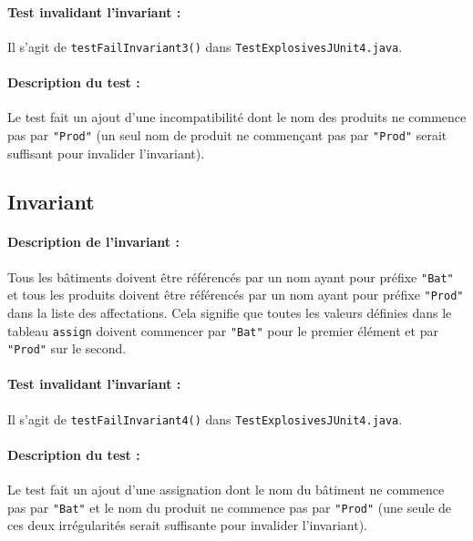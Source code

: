 \documentclass{article}
\begin{document}
\vspace{-0.2cm}
\paragraph{Test invalidant l'invariant :} Il s'agit de \texttt{testFailInvariant3()} dans \texttt{TestExplosivesJUnit4.java}.

\vspace{-0.2cm}
\paragraph{Description du test :} Le test fait un ajout d'une incompatibilité dont le nom des produits ne commence pas par \texttt{"Prod"} (un seul nom de produit ne commençant pas par \texttt{"Prod"} serait suffisant pour invalider l'invariant).

\subsection{Invariant }

\paragraph{Description de l'invariant :} Tous les bâtiments doivent être référencés par un nom ayant pour préfixe \texttt{"Bat"} et tous les produits doivent être référencés par un nom ayant pour préfixe \texttt{"Prod"} dans la liste des affectations. Cela signifie que toutes les valeurs définies dans le tableau \texttt{assign} doivent commencer par \texttt{"Bat"} pour le premier élément et par \texttt{"Prod"} sur le second.

\vspace{-0.2cm}
\paragraph{Test invalidant l'invariant :} Il s'agit de \texttt{testFailInvariant4()} dans \texttt{TestExplosivesJUnit4.java}.

\vspace{-0.2cm}
\paragraph{Description du test :} Le test fait un ajout d'une assignation dont le nom du bâtiment ne commence pas par \texttt{"Bat"} et le nom du produit ne commence pas par \texttt{"Prod"} (une seule de ces deux irrégularités serait suffisante pour invalider l'invariant).
\end{document}
